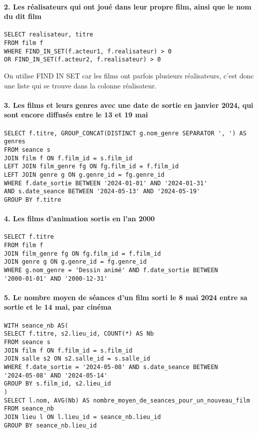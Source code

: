 \documentclass[12pt]{article}
\begin{document}
\paragraph*{2. Les réalisateurs qui ont joué dans leur propre film, ainsi que le nom du dit film}
\begin{verbatim}
SELECT realisateur, titre 
FROM film f  
WHERE FIND_IN_SET(f.acteur1, f.realisateur) > 0 
OR FIND_IN_SET(f.acteur2, f.realisateur) > 0 
\end{verbatim}
On utilise FIND IN SET car les films ont parfois plusieurs réalisateurs, 
c'est donc une liste qui se trouve dans la colonne réalisateur.
\paragraph*{3. Les films et leurs genres avec une date de sortie en janvier 2024, qui sont encore diffusés entre le 13 et 19 mai}
\begin{verbatim}
SELECT f.titre, GROUP_CONCAT(DISTINCT g.nom_genre SEPARATOR ', ') AS genres 
FROM seance s  
JOIN film f ON f.film_id = s.film_id  
LEFT JOIN film_genre fg ON fg.film_id = f.film_id  
LEFT JOIN genre g ON g.genre_id = fg.genre_id  
WHERE f.date_sortie BETWEEN '2024-01-01' AND '2024-01-31' 
AND s.date_seance BETWEEN '2024-05-13' AND '2024-05-19'  
GROUP BY f.titre 
\end{verbatim}
\paragraph*{4. Les films d'animation sortis en l'an 2000}
\begin{verbatim}
SELECT f.titre
FROM film f  
JOIN film_genre fg ON fg.film_id = f.film_id  
JOIN genre g ON g.genre_id = fg.genre_id  
WHERE g.nom_genre = 'Dessin animé' AND f.date_sortie BETWEEN 
'2000-01-01' AND '2000-12-31' 
\end{verbatim}
\paragraph*{5. Le nombre moyen de séances d'un film sorti le 8 mai 2024 entre sa sortie et le 14 mai, par cinéma}
\begin{verbatim}
WITH seance_nb AS( 
SELECT f.titre, s2.lieu_id, COUNT(*) AS Nb 
FROM seance s  
JOIN film f ON f.film_id = s.film_id  
JOIN salle s2 ON s2.salle_id = s.salle_id  
WHERE f.date_sortie = '2024-05-08' AND s.date_seance BETWEEN 
'2024-05-08' AND '2024-05-14' 
GROUP BY s.film_id, s2.lieu_id  
) 
SELECT l.nom, AVG(Nb) AS nombre_moyen_de_seances_pour_un_nouveau_film 
FROM seance_nb 
JOIN lieu l ON l.lieu_id = seance_nb.lieu_id 
GROUP BY seance_nb.lieu_id 
\end{verbatim}
\end{document}

